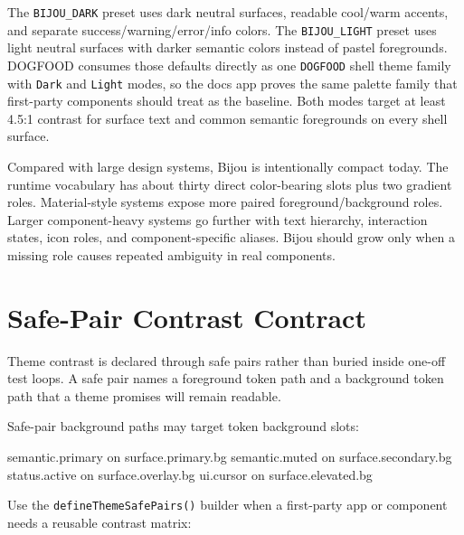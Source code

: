 The \texttt{B\allowbreak{}I\allowbreak{}J\allowbreak{}O\allowbreak{}U\allowbreak{}\_\allowbreak{}D\allowbreak{}A\allowbreak{}R\allowbreak{}K} preset uses dark neutral surfaces, readable cool/warm accents, and separate success/warning/error/info colors. The \texttt{B\allowbreak{}I\allowbreak{}J\allowbreak{}O\allowbreak{}U\allowbreak{}\_\allowbreak{}L\allowbreak{}I\allowbreak{}G\allowbreak{}H\allowbreak{}T} preset uses light neutral surfaces with darker semantic colors instead of pastel foregrounds. DOGFOOD consumes those defaults directly as one \texttt{D\allowbreak{}O\allowbreak{}G\allowbreak{}F\allowbreak{}O\allowbreak{}O\allowbreak{}D} shell theme family with \texttt{D\allowbreak{}a\allowbreak{}r\allowbreak{}k} and \texttt{L\allowbreak{}i\allowbreak{}g\allowbreak{}h\allowbreak{}t} modes, so the docs app proves the same palette family that first-party components should treat as the baseline. Both modes target at least 4.5:1 contrast for surface text and common semantic foregrounds on every shell surface.

Compared with large design systems, Bijou is intentionally compact today. The runtime vocabulary has about thirty direct color-bearing slots plus two gradient roles. Material-style systems expose more paired foreground/background roles. Larger component-heavy systems go further with text hierarchy, interaction states, icon roles, and component-specific aliases. Bijou should grow only when a missing role causes repeated ambiguity in real components.

\section{Safe-Pair Contrast Contract}\label{record-028-safe-pair-contrast-contract}

Theme contrast is declared through safe pairs rather than buried inside one-off test loops. A safe pair names a foreground token path and a background token path that a theme promises will remain readable.

Safe-pair background paths may target token background slots:

\begin{CodeBlock}
semantic.primary on surface.primary.bg
semantic.muted on surface.secondary.bg
status.active on surface.overlay.bg
ui.cursor on surface.elevated.bg
\end{CodeBlock}

Use the \texttt{d\allowbreak{}e\allowbreak{}f\allowbreak{}i\allowbreak{}n\allowbreak{}e\allowbreak{}T\allowbreak{}h\allowbreak{}e\allowbreak{}m\allowbreak{}e\allowbreak{}S\allowbreak{}a\allowbreak{}f\allowbreak{}e\allowbreak{}P\allowbreak{}a\allowbreak{}i\allowbreak{}r\allowbreak{}s\allowbreak{}(\allowbreak{})} builder when a first-party app or component needs a reusable contrast matrix:

